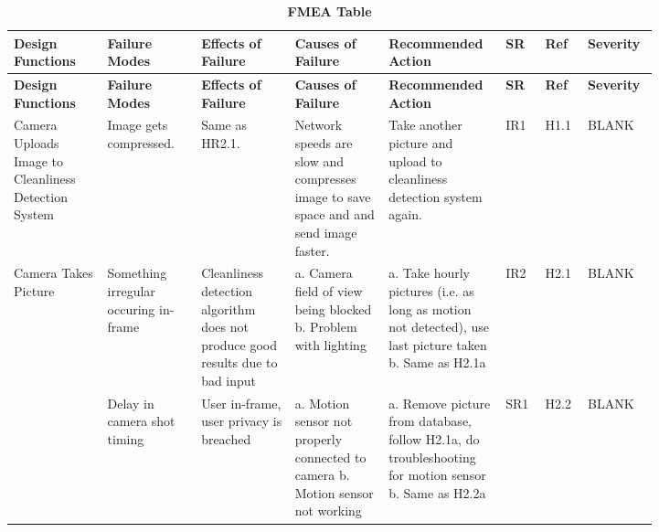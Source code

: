 \documentclass{article}
\begin{document}
\begin{longtable}{|>{\raggedright\arraybackslash}p{0.13\linewidth} | >{\raggedright\arraybackslash}p{0.13\linewidth} | >{\raggedright\arraybackslash}p{0.13\linewidth}| >{\raggedright\arraybackslash}p{0.13\linewidth}| >{\raggedright\arraybackslash}p{0.13\linewidth}| >{\raggedright\arraybackslash}p{0.05\linewidth}| >{\raggedright\arraybackslash}p{0.05\linewidth}| >{\raggedright\arraybackslash}p{0.07\linewidth}|}
    \caption{\bf FMEA Table} \label{tab:my_label} \\
    
    \hline
    \textbf{Design Functions} & \textbf{Failure Modes} & \textbf{Effects of Failure} & \textbf{Causes of Failure} & \textbf{Recommended Action} & \textbf{SR} & \textbf{Ref} & \textbf{Severity}\\
    \hline
    \endfirsthead
    
    \hline
    \textbf{Design Functions} & \textbf{Failure Modes} & \textbf{Effects of Failure} & \textbf{Causes of Failure} & \textbf{Recommended Action} & \textbf{SR} & \textbf{Ref} & \textbf{Severity}\\
    \hline
    \endhead
    
    \hline
    \endfoot
    
    \hline
    \endlastfoot
    
    Camera Uploads Image to Cleanliness Detection System & Image gets compressed. & Same as HR2.1. & Network speeds are slow and compresses image to save space and and send image faster. & Take another picture and upload to cleanliness detection system again. & IR1 & H1.1 & BLANK\\


    \hline
    Camera Takes Picture & Something irregular occuring in-frame \newline & Cleanliness detection algorithm does not produce good results due to bad input\newline & a. Camera field of view being blocked \newline b. Problem with lighting  \newline & a. Take hourly pictures (i.e. as long as motion not detected), use last picture taken \newline b. Same as H2.1a  \newline & IR2  \newline & H2.1  \newline & BLANK\\
    & Delay in camera shot timing & User in-frame, user privacy is breached & a. Motion sensor not properly connected to camera  \newline b. Motion sensor not working &  a. Remove picture from database, follow H2.1a, do troubleshooting for motion sensor \newline b. Same as H2.2a \newline & SR1 & H2.2 & BLANK\\
    

\end{longtable}
\end{document}
